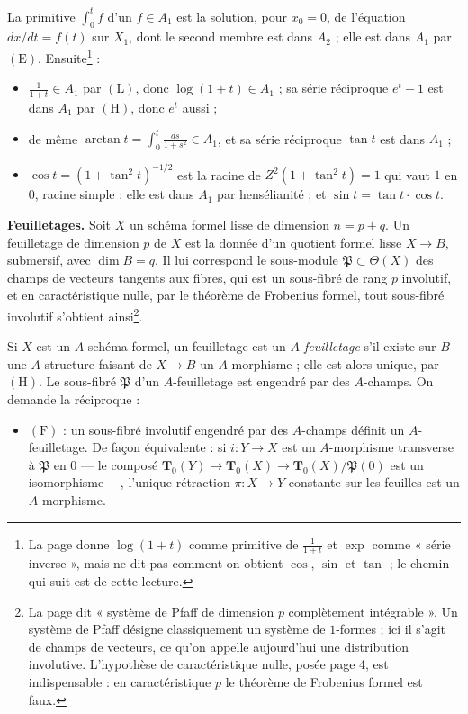 \documentclass[11pt,a4paper]{article}
\begin{document}
La primitive $\int_0^t f$ d'un $f \in A_1$ est la solution, pour
$x_0 = 0$, de l'équation $dx/dt = f(t)$ sur $X_1$, dont le second membre est
dans $A_2$ ; elle est dans $A_1$ par $(\mathrm{E})$. Ensuite\footnote{La page
donne $\log(1+t)$ comme primitive de $\frac{1}{1+t}$ et $\exp$ comme « série
inverse », mais ne dit pas comment on obtient $\cos$, $\sin$ et $\tan$ ; le
chemin qui suit est de cette lecture.} :

\begin{itemize}
  \item $\frac{1}{1+t} \in A_1$ par $(\mathrm{L})$, donc $\log(1+t) \in A_1$ ; sa
    série réciproque $e^t - 1$ est dans $A_1$ par $(\mathrm{H})$, donc $e^t$ aussi ;
  \item de même $\arctan t = \int_0^t \frac{ds}{1+s^2} \in A_1$, et sa série
    réciproque $\tan t$ est dans $A_1$ ;
  \item $\cos t = (1 + \tan^2 t)^{-1/2}$ est la racine de $Z^2 (1 + \tan^2 t) = 1$
    qui vaut $1$ en $0$, racine simple : elle est dans $A_1$ par
    hensélianité ; et $\sin t = \tan t \cdot \cos t$.
\end{itemize}

\textbf{Feuilletages.} Soit $X$ un schéma formel lisse de dimension $n = p + q$.
Un feuilletage de dimension $p$ de $X$ est la donnée d'un quotient formel lisse
$X \to B$, submersif, avec $\dim B = q$. Il lui correspond le sous-module
$\mathfrak{P} \subset \Theta(X)$ des champs de vecteurs tangents aux fibres, qui
est un sous-fibré de rang $p$ involutif, et en caractéristique nulle, par le
théorème de Frobenius formel, tout sous-fibré involutif s'obtient ainsi\footnote{La
page dit « système de Pfaff de dimension $p$ complètement intégrable ». Un
système de Pfaff désigne classiquement un système de $1$-formes ; ici il
s'agit de champs de vecteurs, ce qu'on appelle aujourd'hui une distribution
involutive. L'hypothèse de caractéristique nulle, posée page 4, est
indispensable : en caractéristique $p$ le théorème de Frobenius formel est
faux.}.

Si $X$ est un $A$-schéma formel, un feuilletage est un \emph{$A$-feuilletage}
s'il existe sur $B$ une $A$-structure faisant de $X \to B$ un $A$-morphisme ;
elle est alors unique, par $(\mathrm{H})$. Le sous-fibré $\mathfrak{P}$ d'un
$A$-feuilletage est engendré par des $A$-champs. On demande la réciproque :

\begin{itemize}
  \item $(\mathrm{F})$ : un sous-fibré involutif engendré par des $A$-champs
    définit un $A$-feuilletage. De façon équivalente : si $i : Y \to X$ est un
    $A$-morphisme transverse à $\mathfrak{P}$ en $0$ — le composé
    $\mathbf{T}_0(Y) \to \mathbf{T}_0(X) \to \mathbf{T}_0(X)/\mathfrak{P}(0)$ est un
    isomorphisme —, l'unique rétraction $\pi : X \to Y$ constante sur les
    feuilles est un $A$-morphisme.
\end{itemize}
\end{document}
